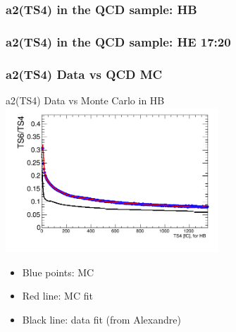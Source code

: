 \documentclass[bigger]{beamer}
\begin{document}
\begin{frame}
\frametitle{a2(TS4) in the QCD sample: HB}
\label{sec-3-6-2}
\label{sec-3-6-2-1}

\begin{center}
\resizebox*{!}{0.75\textheight}{

}
\end{center}
\end{frame}
\begin{frame}
\frametitle{a2(TS4) in the QCD sample: HE 17:20}
\label{sec-3-6-3}
\label{sec-3-6-3-1}

\begin{center}
\resizebox*{!}{0.75\textheight}{

}
\end{center}
\end{frame}
\begin{frame}
\frametitle{a2(TS4) Data vs QCD MC}
\label{sec-3-6-4}
\label{sec-3-6-4-1}

\centering
a2(TS4) Data vs Monte Carlo in HB
\includegraphics[width=0.6\textwidth]{fig/a2_ring0_daata.png}
\label{sec-3-6-4-2}
\begin{itemize}

\item Blue points: MC
\label{sec-3-6-4-2-1}%

\item Red line: MC fit
\label{sec-3-6-4-2-2}%

\item Black line: data fit (from Alexandre)
\label{sec-3-6-4-2-3}%
\end{itemize} %
\end{frame}
\end{document}
